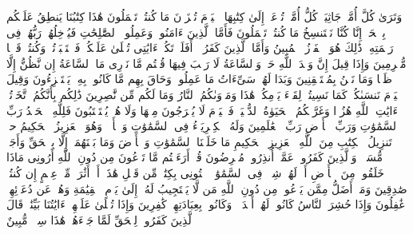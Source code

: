\startbuffer[\q:45:28]
وَتَرَىٰ كُلَّ أُمَّةࣲ جَاثِیَةࣰۚ كُلُّ أُمَّةࣲ تُدۡعَىٰۤ إِلَىٰ كِتَٰبِهَا ٱلۡیَوۡمَ تُجۡزَوۡنَ مَا كُنتُمۡ تَعۡمَلُونَ%
\stopbuffer%
\startbuffer[\q:45:29]
هَٰذَا كِتَٰبُنَا یَنطِقُ عَلَیۡكُم بِٱلۡحَقِّۚ إِنَّا كُنَّا نَسۡتَنسِخُ مَا كُنتُمۡ تَعۡمَلُونَ%
\stopbuffer%
\startbuffer[\q:45:30]
فَأَمَّا ٱلَّذِینَ ءَامَنُوا۟ وَعَمِلُوا۟ ٱلصَّٰلِحَٰتِ فَیُدۡخِلُهُمۡ رَبُّهُمۡ فِی رَحۡمَتِهِۦۚ ذَٰلِكَ هُوَ ٱلۡفَوۡزُ ٱلۡمُبِینُ%
\stopbuffer%
\startbuffer[\q:45:31]
وَأَمَّا ٱلَّذِینَ كَفَرُوۤا۟ أَفَلَمۡ تَكُنۡ ءَایَٰتِی تُتۡلَىٰ عَلَیۡكُمۡ فَٱسۡتَكۡبَرۡتُمۡ وَكُنتُمۡ قَوۡمࣰا مُّجۡرِمِینَ%
\stopbuffer%
\startbuffer[\q:45:32]
وَإِذَا قِیلَ إِنَّ وَعۡدَ ٱللَّهِ حَقࣱّ وَٱلسَّاعَةُ لَا رَیۡبَ فِیهَا قُلۡتُم مَّا نَدۡرِی مَا ٱلسَّاعَةُ إِن نَّظُنُّ إِلَّا ظَنࣰّا وَمَا نَحۡنُ بِمُسۡتَیۡقِنِینَ%
\stopbuffer%
\startbuffer[\q:45:33]
وَبَدَا لَهُمۡ سَیِّءَاتُ مَا عَمِلُوا۟ وَحَاقَ بِهِم مَّا كَانُوا۟ بِهِۦ یَسۡتَهۡزِءُونَ%
\stopbuffer%
\startbuffer[\q:45:34]
وَقِیلَ ٱلۡیَوۡمَ نَنسَىٰكُمۡ كَمَا نَسِیتُمۡ لِقَاۤءَ یَوۡمِكُمۡ هَٰذَا وَمَأۡوَىٰكُمُ ٱلنَّارُ وَمَا لَكُم مِّن نَّٰصِرِینَ%
\stopbuffer%
\startbuffer[\q:45:35]
ذَٰلِكُم بِأَنَّكُمُ ٱتَّخَذۡتُمۡ ءَایَٰتِ ٱللَّهِ هُزُوࣰا وَغَرَّتۡكُمُ ٱلۡحَیَوٰةُ ٱلدُّنۡیَاۚ فَٱلۡیَوۡمَ لَا یُخۡرَجُونَ مِنۡهَا وَلَا هُمۡ یُسۡتَعۡتَبُونَ%
\stopbuffer%
\startbuffer[\q:45:36]
فَلِلَّهِ ٱلۡحَمۡدُ رَبِّ ٱلسَّمَٰوَٰتِ وَرَبِّ ٱلۡأَرۡضِ رَبِّ ٱلۡعَٰلَمِینَ%
\stopbuffer%
\startbuffer[\q:45:37]
وَلَهُ ٱلۡكِبۡرِیَاۤءُ فِی ٱلسَّمَٰوَٰتِ وَٱلۡأَرۡضِۖ وَهُوَ ٱلۡعَزِیزُ ٱلۡحَكِیمُ%
\stopbuffer%
\startbuffer[\q:46:1]
حمۤ%
\stopbuffer%
\startbuffer[\q:46:2]
تَنزِیلُ ٱلۡكِتَٰبِ مِنَ ٱللَّهِ ٱلۡعَزِیزِ ٱلۡحَكِیمِ%
\stopbuffer%
\startbuffer[\q:46:3]
مَا خَلَقۡنَا ٱلسَّمَٰوَٰتِ وَٱلۡأَرۡضَ وَمَا بَیۡنَهُمَاۤ إِلَّا بِٱلۡحَقِّ وَأَجَلࣲ مُّسَمࣰّىۚ وَٱلَّذِینَ كَفَرُوا۟ عَمَّاۤ أُنذِرُوا۟ مُعۡرِضُونَ%
\stopbuffer%
\startbuffer[\q:46:4]
قُلۡ أَرَءَیۡتُم مَّا تَدۡعُونَ مِن دُونِ ٱللَّهِ أَرُونِی مَاذَا خَلَقُوا۟ مِنَ ٱلۡأَرۡضِ أَمۡ لَهُمۡ شِرۡكࣱ فِی ٱلسَّمَٰوَٰتِۖ ٱئۡتُونِی بِكِتَٰبࣲ مِّن قَبۡلِ هَٰذَاۤ أَوۡ أَثَٰرَةࣲ مِّنۡ عِلۡمٍ إِن كُنتُمۡ صَٰدِقِینَ%
\stopbuffer%
\startbuffer[\q:46:5]
وَمَنۡ أَضَلُّ مِمَّن یَدۡعُوا۟ مِن دُونِ ٱللَّهِ مَن لَّا یَسۡتَجِیبُ لَهُۥۤ إِلَىٰ یَوۡمِ ٱلۡقِیَٰمَةِ وَهُمۡ عَن دُعَاۤئِهِمۡ غَٰفِلُونَ%
\stopbuffer%
\startbuffer[\q:46:6]
وَإِذَا حُشِرَ ٱلنَّاسُ كَانُوا۟ لَهُمۡ أَعۡدَاۤءࣰ وَكَانُوا۟ بِعِبَادَتِهِمۡ كَٰفِرِینَ%
\stopbuffer%
\startbuffer[\q:46:7]
وَإِذَا تُتۡلَىٰ عَلَیۡهِمۡ ءَایَٰتُنَا بَیِّنَٰتࣲ قَالَ ٱلَّذِینَ كَفَرُوا۟ لِلۡحَقِّ لَمَّا جَاۤءَهُمۡ هَٰذَا سِحۡرࣱ مُّبِینٌ%
\stopbuffer%
\startbuffer[\q:46:8]
